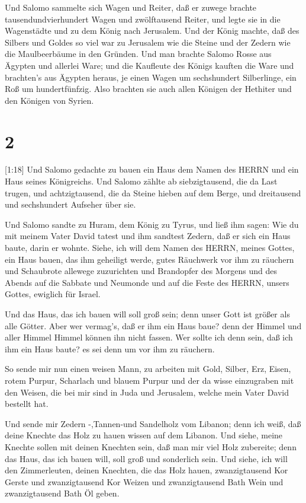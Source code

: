  Und Salomo sammelte sich Wagen und Reiter, daß er zuwege
brachte tausendundvierhundert Wagen und zwölftausend Reiter, und legte
sie in die Wagenstädte und zu dem König nach Jerusalem. 
Und der König machte, daß des Silbers und Goldes so viel war zu
Jerusalem wie die Steine und der Zedern wie die Maulbeerbäume in den
Gründen.  Und man brachte Salomo Rosse aus Ägypten und
allerlei Ware; und die Kaufleute des Königs kauften die Ware
 und brachten's aus Ägypten heraus, je einen Wagen um
sechshundert Silberlinge, ein Roß um hundertfünfzig. Also brachten sie
auch allen Königen der Hethiter und den Königen von Syrien.

\hypertarget{section-1}{%
\section{2}\label{section-1}}

 {[}1:18{]} Und Salomo gedachte zu bauen ein Haus dem Namen
des HERRN und ein Haus seines Königreichs.  Und Salomo
zählte ab siebzigtausend, die da Last trugen, und achtzigtausend, die da
Steine hieben auf dem Berge, und dreitausend und sechshundert Aufseher
über sie.

 Und Salomo sandte zu Huram, dem König zu Tyrus, und ließ
ihm sagen: Wie du mit meinem Vater David tatest und ihm sandtest Zedern,
daß er sich ein Haus baute, darin er wohnte.  Siehe, ich
will dem Namen des HERRN, meines Gottes, ein Haus bauen, das ihm
geheiligt werde, gutes Räuchwerk vor ihm zu räuchern und Schaubrote
allewege zuzurichten und Brandopfer des Morgens und des Abends auf die
Sabbate und Neumonde und auf die Feste des HERRN, unsers Gottes,
ewiglich für Israel.

 Und das Haus, das ich bauen will soll groß sein; denn unser
Gott ist größer als alle Götter.  Aber wer vermag's, daß er
ihm ein Haus baue? denn der Himmel und aller Himmel Himmel können ihn
nicht fassen. Wer sollte ich denn sein, daß ich ihm ein Haus baute? es
sei denn um vor ihm zu räuchern.

 So sende mir nun einen weisen Mann, zu arbeiten mit Gold,
Silber, Erz, Eisen, rotem Purpur, Scharlach und blauem Purpur und der da
wisse einzugraben mit den Weisen, die bei mir sind in Juda und
Jerusalem, welche mein Vater David bestellt hat.

 Und sende mir Zedern -,Tannen-und Sandelholz vom Libanon;
denn ich weiß, daß deine Knechte das Holz zu hauen wissen auf dem
Libanon. Und siehe, meine Knechte sollen mit deinen Knechten sein,
 daß man mir viel Holz zubereite; denn das Haus, das ich
bauen will, soll groß und sonderlich sein.  Und siehe, ich
will den Zimmerleuten, deinen Knechten, die das Holz hauen,
zwanzigtausend Kor Gerste und zwanzigtausend Kor Weizen und
zwanzigtausend Bath Wein und zwanzigtausend Bath Öl geben.


